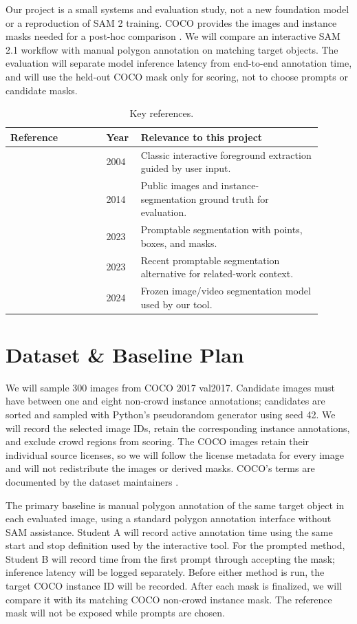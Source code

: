 \documentclass[11pt]{article}
\begin{document}
Our project is a small systems and evaluation study, not a new foundation model
or a reproduction of SAM 2 training. COCO provides the images and instance masks
needed for a post-hoc comparison \citep{lin2014coco}. We will compare an
interactive SAM 2.1 workflow with manual polygon annotation on matching target
objects. The evaluation will separate model inference latency from end-to-end
annotation time, and will use the held-out COCO mask only for scoring, not to
choose prompts or candidate masks.

\begin{table}[ht]
\centering
\caption{Key references.}
\label{tab:refs}
\begin{tabular}{@{}p{0.29\linewidth}p{0.08\linewidth}p{0.53\linewidth}@{}}
\toprule
\textbf{Reference} & \textbf{Year} & \textbf{Relevance to this project} \\
\midrule
\citep{rother2004grabcut} & 2004 & Classic interactive foreground extraction guided by user input. \\
\citep{lin2014coco} & 2014 & Public images and instance-segmentation ground truth for evaluation. \\
\citep{kirillov2023sam} & 2023 & Promptable segmentation with points, boxes, and masks. \\
\citep{zhao2023fastsam} & 2023 & Recent promptable segmentation alternative for related-work context. \\
\citep{ravi2024sam2} & 2024 & Frozen image/video segmentation model used by our tool. \\
\bottomrule
\end{tabular}
\end{table}

\section{Dataset \& Baseline Plan}
\label{sec:data}
We will sample 300 images from COCO 2017 val2017. Candidate images must have
between one and eight non-crowd instance annotations; candidates are sorted and
sampled with Python's pseudorandom generator using seed 42. We will record the
selected image IDs, retain the corresponding instance annotations, and exclude
crowd regions from scoring. The COCO images retain their individual source
licenses, so we will follow the license metadata for every image and will not
redistribute the images or derived masks. COCO's terms are documented by the
dataset maintainers \citep{cocoTerms}.

The primary baseline is manual polygon annotation of the same target object in
each evaluated image, using a standard polygon annotation interface without SAM
assistance. Student A will record active annotation time using the same start
and stop definition used by the interactive tool. For the prompted method,
Student B will record time from the first prompt through accepting the mask;
inference latency will be logged separately. Before either method is run, the
target COCO instance ID will be recorded. After each mask is finalized, we will
compare it with its matching COCO non-crowd instance mask. The reference mask
will not be exposed while prompts are chosen.
\end{document}
